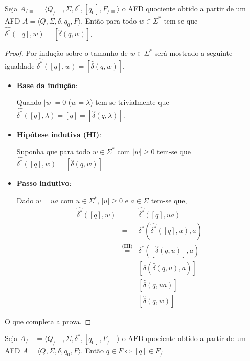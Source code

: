 \begin{theorem}\label{teo:ExtensaoDeltaEstrela}
	Seja  $A_{/\equiv} = \langle Q_{/\equiv}, \Sigma, \delta^*, [q_0],  F_{/\equiv}\rangle$ o AFD quociente obtido a partir de um AFD $A = \langle Q, \Sigma, \delta, q_0, F\rangle$. Então para todo $w \in \Sigma^*$ tem-se que $\widehat{\delta^*}([q], w) = [\widehat{\delta}(q, w)]$.
\end{theorem}

\begin{proof}
	Por indução sobre o tamanho de $w \in \Sigma^*$ será mostrado a seguinte igualdade $\widehat{\delta^*}([q], w) = [\widehat{\delta}(q, w)]$.
	\begin{itemize}
		\item \textbf{Base da indução}:
		
		Quando $|w| = 0$ ($w = \lambda$) tem-se trivialmente que $\widehat{\delta^*}([q], \lambda) = [q] = [\widehat{\delta}(q, \lambda)]$.
		
		\item \textbf{Hipótese indutiva (HI)}:
		
		Suponha que para todo $w \in \Sigma^*$ com $|w| \geq 0$ tem-se que $\widehat{\delta^*}([q], w) = [\widehat{\delta}(q, w)]$
		\item \textbf{Passo indutivo}:
		
		Dado $w = ua$ com $u \in \Sigma^*$, $|u| \geq 0$ e $a \in \Sigma$ tem-se que, 
		\begin{eqnarray*}
			\widehat{\delta^*}([q], w) & = & \widehat{\delta^*}([q], ua)\\
			& = & \delta^*(\widehat{\delta^*}([q], u),a)\\
			& \stackrel{\textbf{(HI)}}{=} & \delta^*([\widehat{\delta}(q, u)],a)\\
			& = & [\delta(\widehat{\delta}(q, u),a)]\\
			& = & [\widehat{\delta}(q, ua)]\\
			& = & [\widehat{\delta}(q, w)]
		\end{eqnarray*}
	\end{itemize}
	O que completa a prova.
\end{proof}

\begin{theorem}\label{teo:FinalQuociente}
	Seja  $A_{/\equiv} = \langle Q_{/\equiv}, \Sigma, \delta^*, [q_0],  F_{/\equiv}\rangle$ o AFD quociente obtido a partir de um AFD $A = \langle Q, \Sigma, \delta, q_0, F\rangle$. Então $q \in F \Longleftrightarrow [q] \in F_{/\equiv}$
\end{theorem}

